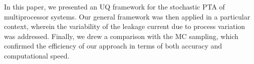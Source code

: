 In this paper, we presented an UQ framework for the stochastic PTA of multiprocessor systems. Our general framework was then applied in a particular context, wherein the variability of the leakage current due to process variation was addressed. Finally, we drew a comparison with the MC sampling, which confirmed the efficiency of our approach in terms of both accuracy and computational speed.

